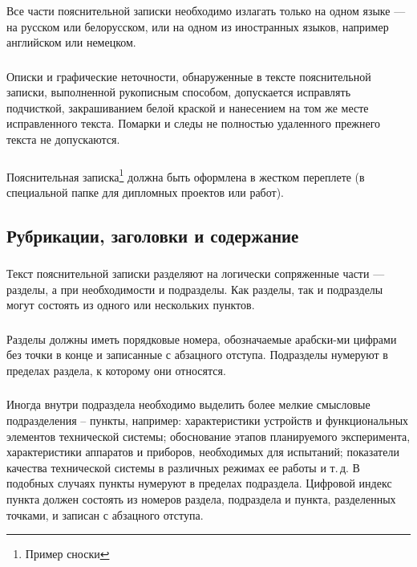 \subsubsection{} 
Все  части  пояснительной  записки  необходимо  излагать  только  на одном языке --- на русском или белорусском, или на одном из иностранных языков, например английском или немецком.

\subsubsection{} 
Описки и графические неточности, обнаруженные в тексте пояснительной записки, выполненной рукописным способом, допускается исправлять подчисткой, закрашиванием белой краской и нанесением на том же месте исправленного текста. Помарки и следы не полностью удаленного прежнего текста не допускаются.

\subsubsection{} 
Пояснительная записка\footnote{Пример сноски} должна быть оформлена в жестком переплете (в специальной папке для дипломных проектов или работ).


\subsection{Рубрикации, заголовки и содержание}

\subsubsection{} 
Текст пояснительной записки разделяют на логически сопряженные части --- разделы, а при необходимости и подразделы. Как разделы, так и подразделы могут состоять из одного или нескольких пунктов.

\subsubsection{}
Разделы должны иметь порядковые  номера,  обозначаемые арабски-ми цифрами без точки  в конце  и записанные с абзацного отступа. Подразделы 
нумеруют в пределах раздела, к которому они относятся.

\subsubsection{}
Иногда внутри подраздела необходимо выделить более мелкие смысловые подразделения – пункты, например: характеристики устройств и функциональных элементов технической системы; обоснование этапов планируемого эксперимента, характеристики аппаратов и приборов, необходимых для испытаний; показатели качества технической системы в различных режимах ее работы и т.\,д. В подобных случаях пункты нумеруют в пределах подраздела. Цифровой индекс пункта должен состоять из номеров раздела, подраздела и пункта, разделенных точками, и записан с абзацного отступа. 

